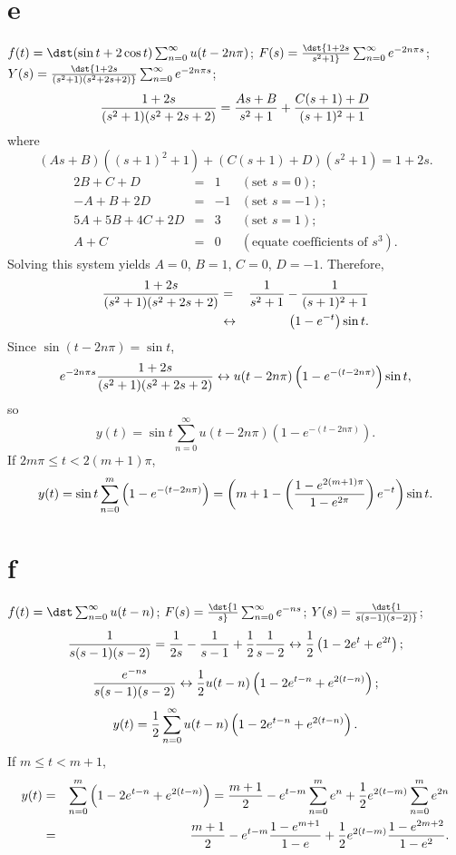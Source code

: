 \documentclass[dvips]{book}
\numberwithin{example}{section}
\numberwithin{equation}{section}
\numberwithin{theorem}{section}
\numberwithin{table}{section}
\numberwithin{figure}{section}
\begin{document}
\part{e}
$f(t)=\dst(\sin t+2\cos t)\sum_{n=0}^\infty u(t-2n\pi)$;
$F(s)=\dst{1+2s\over s^2+1}\sum_{n=0}^\infty e^{-2n\pi s}$;
$Y(s)=\dst{1+2s\over(s^2+1)(s^2+2s+2)}\sum_{n=0}^\infty e^{-2n\pi s}$;
$$
{1+2s\over(s^2+1)(s^2+2s+2)}={As+B\over
s^2+1}+{C(s+1)+D\over(s+1)^2+1}
$$
where
$$
(As+B)((s+1)^2+1)+(C(s+1)+D)(s^2+1)=1+2s.
$$
$$
\begin{array}{rcrl}
2B+C+D&=&1&(\mbox{set }s=0);\\
-A+B+2D&=&-1& (\mbox{set }s=-1);\\
5A+5B+4C+2D&=&3&(\mbox{set }s=1);\\
A+C&=&0&(\mbox{equate coefficients of }s^3).
\end{array}
$$
Solving this system yields $A=0$, $B=1$,
$C=0$, $D=-1$. Therefore,
\begin{eqnarray*}
{1+2s\over(s^2+1)(s^2+2s+2)}
&=&{1\over s^2+1}-{1\over(s+1)^2+1}
\\&\leftrightarrow&\left(1-e^{-t}\right)\sin t.
\end{eqnarray*}
Since $\sin(t-2n\pi)=\sin t$,
$$
e^{-2n\pi s}{1+2s\over(s^2+1)(s^2+2s+2)}\leftrightarrow
u(t-2n\pi)\left(1-e^{-(t-2n\pi)}\right)\sin t,
$$
so
$$
y(t)=\sin t\sum_{n=0}^\infty u(t-2n\pi)\left(1-e^{-(t-2n\pi)}\right).
$$
If $2m\pi\le t<2(m+1)\pi$,
$$
y(t)=\sin t\sum_{n=0}^m\left(1-e^{-(t-2n\pi)}\right)=
\left(m+1-\left(1-e^{2(m+1)\pi}\over
1-e^{2\pi}\right)e^{-t}\right)\sin t.
$$

\part{f}
$f(t)=\dst\sum_{n=0}^\infty u(t-n)$; $F(s)=\dst{1\over
s}\sum_{n=0}^\infty e^{-ns}$; $Y(s)=\dst{1\over s(s-1)(s-2)}$;
$$
{1\over s(s-1)(s-2)}={1\over2s}-{1\over s-1}+{1\over2}{1\over s-2}
\leftrightarrow {1\over2}\left(1-2e^t+e^{2t}\right);
$$
$$
{e^{-ns}\over s(s-1)(s-2)}
\leftrightarrow {1\over2}u(t-n)\left(1-2e^{t-n}+e^{2(t-n)}\right);
$$
$$
y(t)={1\over2}\sum_{n=0}^\infty
u(t-n)\left(1-2e^{t-n}+e^{2(t-n)}\right).
$$
If $m\le t< m+1$,
\begin{eqnarray*}
y(t)&=&\sum_{n=0}^m\left(1-2e^{t-n}+e^{2(t-n)}\right)
={m+1\over2}-e^{t-m}\sum_{n=0}^m e^n
 +{1\over2}e^{2(t-m)}\sum_{n=0}^m e^{2n}\\
&=&{m+1\over2}-e^{t-m}{1-e^{m+1}\over
1-e}+{1\over2}e^{2(t-m)}{1-e^{2m+2}\over1-e^2}.
\end{eqnarray*}
\end{document}
